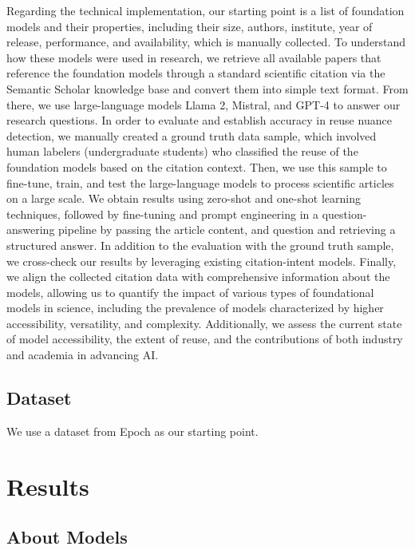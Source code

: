 \documentclass[acmsmall,authorversion]{acmart}
\begin{document}
Regarding the technical implementation, our starting point is a list of foundation models and their properties, including their size, authors, institute, year of release, performance, and availability, which is manually collected. To understand how these models were used in research, we retrieve all available papers that reference the foundation models through a standard scientific citation via the Semantic Scholar knowledge base and convert them into simple text format. From there, we use large-language models Llama 2, Mistral, and GPT-4 to answer our research questions. In order to evaluate and establish accuracy in reuse nuance detection, we manually created a ground truth data sample, which involved human labelers (undergraduate students) who classified the reuse of the foundation models based on the citation context. Then, we use this sample to fine-tune, train, and test the large-language models to process scientific articles on a large scale. We obtain results using zero-shot and one-shot learning techniques, followed by fine-tuning and prompt engineering in a question-answering pipeline by passing the article content, and question and retrieving a structured answer. In addition to the evaluation with the ground truth sample, we cross-check our results by leveraging existing citation-intent models. Finally, we align the collected citation data with comprehensive information about the models, allowing us to quantify the impact of various types of foundational models in science, including the prevalence of models characterized by higher accessibility, versatility, and complexity. Additionally, we assess the current state of model accessibility, the extent of reuse, and the contributions of both industry and academia in advancing AI.

\subsection{Dataset}

We use a dataset from Epoch as our starting point.


\section{Results} 

\subsection{About Models}
\end{document}
